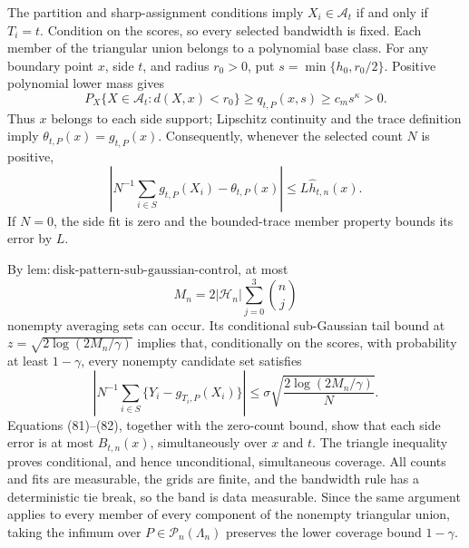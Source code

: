 The partition and sharp-assignment conditions imply
\(X_i\in\mathcal A_t\) if and only if \(T_i=t\).  Condition on the
scores, so every selected bandwidth is fixed.  Each member of the
triangular union belongs to a polynomial base class.  For any boundary
point \(x\), side \(t\), and radius \(r_0>0\), put
\(s=\min\{h_0,r_0/2\}\).  Positive polynomial lower mass gives
\[
 P_X\{X\in\mathcal A_t:d(X,x)<r_0\}
 \ge q_{t,P}(x,s)\ge c_ms^\kappa>0.
\]
Thus \(x\) belongs to each side support; Lipschitz continuity and the
trace definition imply \(\theta_{t,P}(x)=g_{t,P}(x)\).  Consequently,
whenever the selected count \(N\) is positive,
\[
 \left|N^{-1}\sum_{i\in S}g_{t,P}(X_i)-\theta_{t,P}(x)\right|
 \le L\widehat h_{t,n}(x). \tag{81}
\]
If \(N=0\), the side fit is zero and the bounded-trace member property
bounds its error by \(L\).

By
\(\mathrm{lem:disk\text{-}pattern\text{-}sub\text{-}gaussian\text{-}control}\),
at most
\[
 M_n=2|\mathcal H_n|\sum_{j=0}^3\binom nj
\]
nonempty averaging sets can occur.  Its conditional sub-Gaussian tail
bound at \(z=\sqrt{2\log(2M_n/\gamma)}\) implies that, conditionally on
the scores, with probability at least \(1-\gamma\), every nonempty
candidate set satisfies
\[
 \left|N^{-1}\sum_{i\in S}\{Y_i-g_{T_i,P}(X_i)\}\right|
 \le\sigma\sqrt{\frac{2\log(2M_n/\gamma)}N}. \tag{82}
\]
Equations (81)--(82), together with the zero-count bound, show that each
side error is at most \(B_{t,n}(x)\), simultaneously over \(x\) and
\(t\).  The triangle inequality proves conditional, and hence
unconditional, simultaneous coverage.  All counts and fits are
measurable, the grids are finite, and the bandwidth rule has a
deterministic tie break, so the band is data measurable.  Since the same
argument applies to every member of every component of the nonempty
triangular union, taking the infimum over
\(P\in\mathcal P_n(\Lambda_n)\) preserves the lower coverage bound
\(1-\gamma\).

